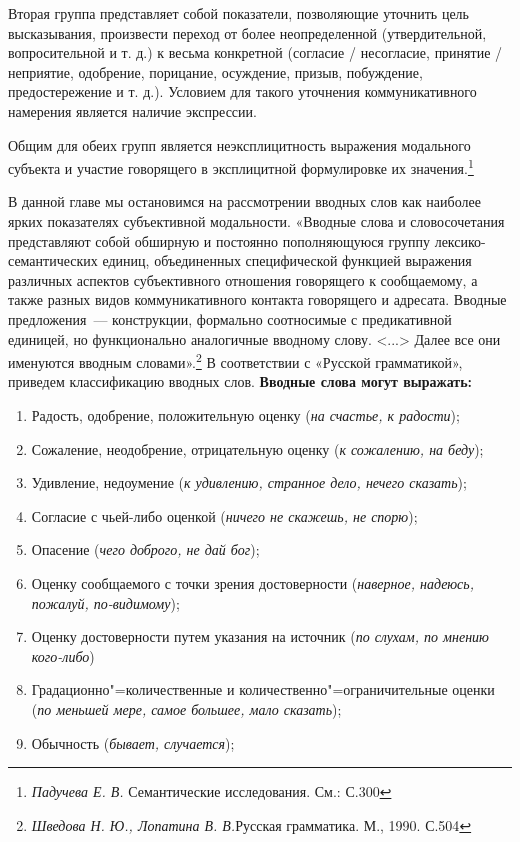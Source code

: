 \documentclass{kursa4}
\begin{document}
      Вторая группа представляет собой показатели, позволяющие уточнить цель высказывания, произвести переход от более неопределенной (утвердительной, вопросительной и т. д.) к весьма конкретной (согласие / несогласие, принятие / неприятие, одобрение, порицание, осуждение, призыв, побуждение, предостережение и т. д.). Условием для такого уточнения коммуникативного намерения является наличие экспрессии. 

      Общим для обеих групп является неэксплицитность выражения модального субъекта и участие говорящего в эксплицитной формулировке их значения.\footnote{\textit{Падучева Е. В. }Семантические исследования. См.: С.300}

      В данной главе мы остановимся на рассмотрении вводных слов как наиболее ярких показателях субъективной модальности. «Вводные слова и словосочетания представляют собой обширную и постоянно пополняющуюся группу лексико-семантических единиц, объединенных специфической функцией выражения различных аспектов субъективного отношения говорящего к сообщаемому, а также разных видов коммуникативного контакта говорящего и адресата. Вводные предложения~--- конструкции, формально соотносимые с предикативной единицей, но функционально аналогичные вводному слову. \textless{}...\textgreater{}
      Далее все они именуются вводным словами».\footnote{\textit{Шведова Н. Ю., Лопатина В. В.}{Русская грамматика. М., 1990. С.504}}\newline
      В соответствии с «Русской грамматикой», приведем классификацию вводных слов. \textbf{Вводные слова могут выражать:}
      \begin{enumerate}
        \item Радость, одобрение, положительную оценку (\textit{на счастье, к радости}); \item Сожаление, неодобрение, отрицательную оценку (\textit{к сожалению, на беду}); \item Удивление, недоумение (\textit{к удивлению, странное дело, нечего сказать}); \item Согласие с чьей-либо оценкой (\textit{ничего не скажешь, не спорю}); \item Опасение (\textit{чего доброго, не дай бог}); \item Оценку сообщаемого с точки зрения достоверности (\textit{наверное, надеюсь, пожалуй, по-видимому}); \item Оценку достоверности путем указания на источник (\textit{по слухам, по мнению кого-либо}) \item Градационно"=количественные и количественно"=ограничительные оценки (\textit{по меньшей мере, самое большее, мало сказать}); \item Обычность (\textit{бывает, случается}); \end{enumerate}
\end{document}
